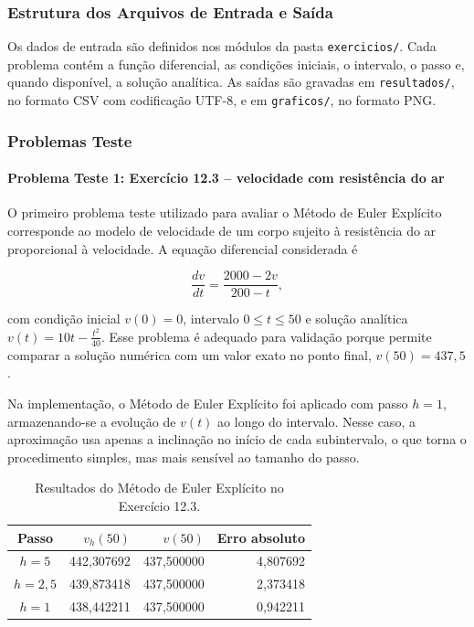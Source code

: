\subsubsection{Estrutura dos Arquivos de Entrada e Saída}

Os dados de entrada são definidos nos módulos da pasta \texttt{exercicios/}. Cada problema contém a função diferencial, as condições iniciais, o intervalo, o passo e, quando disponível, a solução analítica. As saídas são gravadas em \texttt{resultados/}, no formato CSV com codificação UTF-8, e em \texttt{graficos/}, no formato PNG.

\subsubsection{Problemas Teste}

\paragraph{Problema Teste 1: Exercício 12.3 -- velocidade com resistência do ar}

O primeiro problema teste utilizado para avaliar o Método de Euler Explícito corresponde ao modelo de velocidade de um corpo sujeito à resistência do ar proporcional à velocidade. A equação diferencial considerada é

\[
    \frac{dv}{dt}=\frac{2000-2v}{200-t},
\]

com condição inicial \(v(0)=0\), intervalo \(0\leq t\leq 50\) e solução analítica \(v(t)=10t-\frac{t^2}{40}\). Esse problema é adequado para validação porque permite comparar a solução numérica com um valor exato no ponto final, \(v(50)=437{,}5\).

Na implementação, o Método de Euler Explícito foi aplicado com passo \(h=1\), armazenando-se a evolução de \(v(t)\) ao longo do intervalo. Nesse caso, a aproximação usa apenas a inclinação no início de cada subintervalo, o que torna o procedimento simples, mas mais sensível ao tamanho do passo.

\begin{table}[H]
    \centering
    \caption{Resultados do Método de Euler Explícito no Exercício 12.3.}
    \begin{tabular}{c|r|r|r}
        \textbf{Passo} & \textbf{\(v_h(50)\)} & \textbf{\(v(50)\)} & \textbf{Erro absoluto} \\
        \hline
        \(h=5\) & 442{,}307692 & 437{,}500000 & 4{,}807692 \\
        \(h=2{,}5\) & 439{,}873418 & 437{,}500000 & 2{,}373418 \\
        \(h=1\) & 438{,}442211 & 437{,}500000 & 0{,}942211 \\
    \end{tabular}
\end{table}

